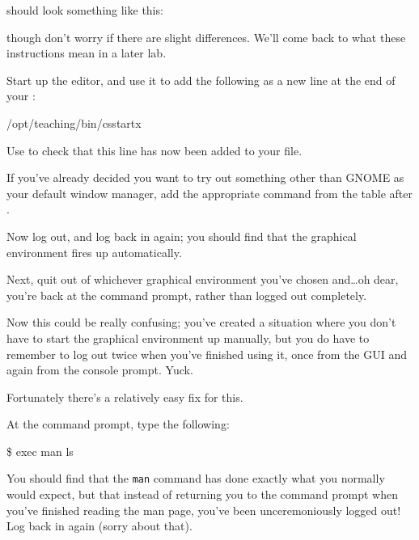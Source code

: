  should look something like this:


though don't worry if there are slight differences. We'll come back to what these instructions mean in a later lab.

Start up the  editor, and use it to add the following as a  new line at the end of your :

\begin{ttoutenv}
/opt/teaching/bin/csstartx
\end{ttoutenv}

Use  to check that this line has now been added to your file.

If you've already decided you want to try out something other than GNOME as your default window manager, add the appropriate command from the table after .

Now log out, and log back in again; you should find that the graphical environment fires up automatically.

Next, quit out of whichever graphical environment you've chosen and\ldots oh dear, you're back at the  command prompt, rather than logged out completely.

Now this could be really confusing; you've created a situation where you don't have to start the graphical environment up manually, but you do have to remember to log out twice when you've finished using it, once from the GUI and again from the console prompt. Yuck.

Fortunately there's a relatively easy fix for this.

At the  command prompt, type the following:

\begin{ttoutenv}
\$ exec man ls
\end{ttoutenv}

You should find that the \texttt{man} command has done exactly what you normally would expect, but that instead of returning you to the command prompt when you've finished reading the man page, you've been unceremoniously logged out! Log back in again (sorry about that).

